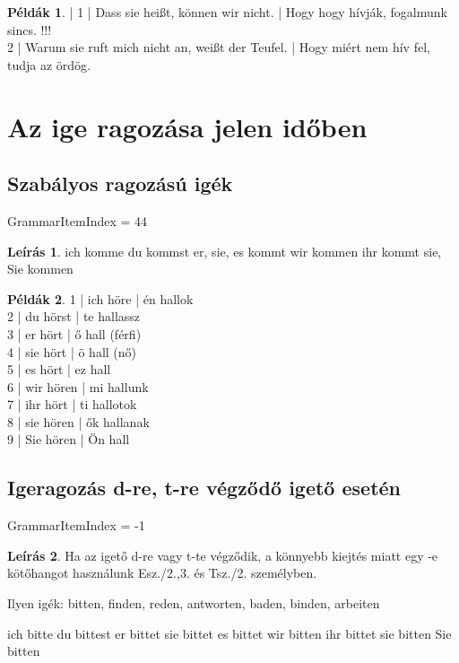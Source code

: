 \documentclass{article}
\theoremstyle{definition}
\newtheorem*{exmp}{Példák}
\newtheorem*{desc}{Leírás}
\begin{document}
\begin{exmp} | %
1 | Dass sie heißt, können wir nicht. | Hogy hogy hívják, fogalmunk sincs. !!!\\
2 | Warum sie ruft mich nicht an, weißt der Teufel. | Hogy miért nem hív fel, tudja az ördög.\\
\end{exmp}


\section{Az ige ragozása jelen időben}

\subsection{Szabályos ragozású igék}

GrammarItemIndex = 44

\begin{desc}
ich komme
du kommst
er, sie, es kommt
wir kommen
ihr kommt
sie, Sie kommen
\end{desc}

\begin{exmp}
1 | ich höre | én hallok\\
2 | du hörst | te hallassz\\
3 | er hört | ő hall (férfi)\\
4 | sie hört | ö hall (nő)\\
5 | es hört | ez hall\\
6 | wir hören | mi hallunk\\
7 | ihr hört | ti hallotok\\
8 | sie hören | ők hallanak\\
9 | Sie hören | Ön hall\\
\end{exmp}

\subsection{Igeragozás d-re, t-re végződő igető esetén}

GrammarItemIndex = -1

\begin{desc}
Ha az igető d-re vagy t-te végződik, a könnyebb kiejtés miatt egy -e
kötőhangot használunk Esz./2.,3. és Tsz./2. személyben.

Ilyen igék: bitten, finden, reden, antworten, baden, binden, arbeiten

ich bitte
du bittest
er bittet
sie bittet
es bittet
wir bitten
ihr bittet
sie bitten
Sie bitten
\end{desc}
\end{document}
